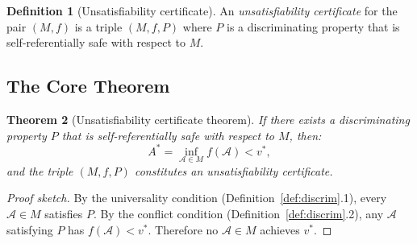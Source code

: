\documentclass[11pt,a4paper]{article}
\theoremstyle{plain}
\newtheorem{theorem}{Theorem}[section]
\theoremstyle{definition}
\newtheorem{definition}[theorem]{Definition}
\theoremstyle{remark}
\begin{document}
\begin{definition}[Unsatisfiability certificate]
\label{def:cert}
An \emph{unsatisfiability certificate} for the pair $(M, f)$ is a triple $(M, f, P)$ where $P$ is a discriminating property that is self-referentially safe with respect to $M$.
\end{definition}

\subsection{The Core Theorem}

\begin{theorem}[Unsatisfiability certificate theorem]
\label{thm:main}
If there exists a discriminating property $P$ that is self-referentially safe with respect to $M$, then:
$$A^* = \inf_{\mathcal{A} \in M} f(\mathcal{A}) < v^*,$$
and the triple $(M, f, P)$ constitutes an unsatisfiability certificate.
\end{theorem}

\begin{proof}[Proof sketch]
By the universality condition (Definition~\ref{def:discrim}.1), every $\mathcal{A} \in M$ satisfies $P$. By the conflict condition (Definition~\ref{def:discrim}.2), any $\mathcal{A}$ satisfying $P$ has $f(\mathcal{A}) < v^*$. Therefore no $\mathcal{A} \in M$ achieves $v^*$.
\end{proof}
\end{document}
